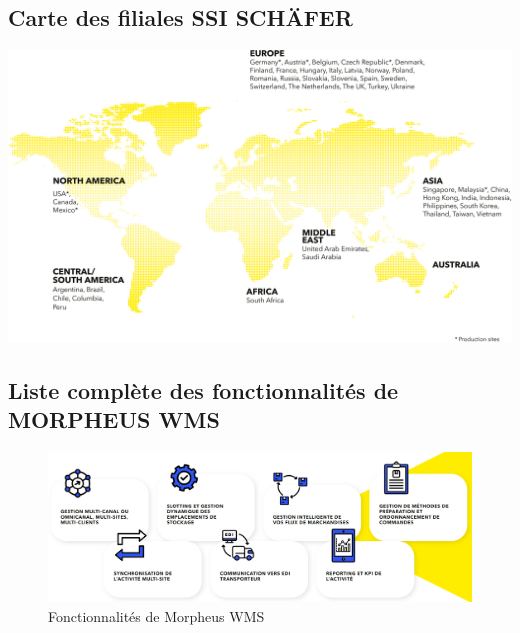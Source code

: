 \documentclass[a4paper, 12pt, french]{article}
\begin{document}
		\subsection{Carte des filiales SSI SCHÄFER}\label{appendix:map}
			\begin{center}
				\includegraphics[width=\textwidth]{images/world_map.jpg}
			\end{center}
		\newpage


		\subsection{Liste complète des fonctionnalités de MORPHEUS WMS}\label{appendix:morpheusWMSFonctionnalites}
			\begin{figure}[h!]
					\includegraphics[width=\linewidth]{images/morpheus_wms_fonctionnalites.png}
					\caption{Fonctionnalités de Morpheus WMS}%
					\label{fig:morpheus_wms_fonctionnalites}
			\end{figure}
\end{document}
